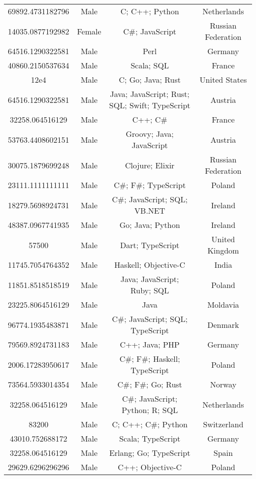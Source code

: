 \begin{center}
\begin{tabular}{ |c|c|c|c| }
69892.4731182796  &  Male  &  C; C++; Python  &  Netherlands  \\ 
14035.0877192982  &  Female  &  C\#; JavaScript  &  Russian Federation  \\ 
64516.1290322581  &  Male  &  Perl  &  Germany  \\ 
40860.2150537634  &  Male  &  Scala; SQL  &  France  \\ 
12e4  &  Male  &  C; Go; Java; Rust  &  United States  \\ 
64516.1290322581  &  Male  &  Java; JavaScript; Rust; SQL; Swift; TypeScript  &  Austria  \\ 
32258.064516129  &  Male  &  C++; C\#  &  France  \\ 
53763.4408602151  &  Male  &  Groovy; Java; JavaScript  &  Austria  \\ 
30075.1879699248  &  Male  &  Clojure; Elixir  &  Russian Federation  \\ 
23111.1111111111  &  Male  &  C\#; F\#; TypeScript  &  Poland  \\ 
18279.5698924731  &  Male  &  C\#; JavaScript; SQL; VB.NET  &  Ireland  \\ 
48387.0967741935  &  Male  &  Go; Java; Python  &  Ireland  \\ 
57500  &  Male  &  Dart; TypeScript  &  United Kingdom  \\ 
11745.7054764352  &  Male  &  Haskell; Objective-C  &  India  \\ 
11851.8518518519  &  Male  &  Java; JavaScript; Ruby; SQL  &  Poland  \\ 
23225.8064516129  &  Male  &  Java  &  Moldavia  \\ 
96774.1935483871  &  Male  &  C\#; JavaScript; SQL; TypeScript  &  Denmark  \\ 
79569.8924731183  &  Male  &  C++; Java; PHP  &  Germany  \\ 
2006.17283950617  &  Male  &  C\#; F\#; Haskell; TypeScript  &  Poland  \\ 
73564.5933014354  &  Male  &  C\#; F\#; Go; Rust  &  Norway  \\ 
32258.064516129  &  Male  &  C\#; JavaScript; Python; R; SQL  &  Netherlands  \\ 
83200  &  Male  &  C; C++; C\#; Python  &  Switzerland  \\ 
43010.752688172  &  Male  &  Scala; TypeScript  &  Germany  \\ 
32258.064516129  &  Male  &  Erlang; Go; TypeScript  &  Spain  \\ 
29629.6296296296  &  Male  &  C++; Objective-C  &  Poland  \\ 

\end{tabular}
\end{center}
